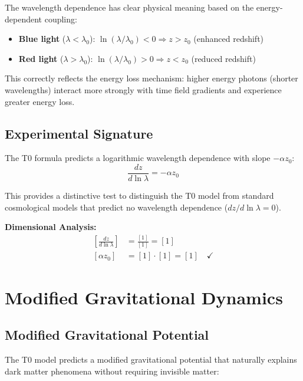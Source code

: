 \documentclass[12pt,a4paper]{report}
\begin{document}
	The wavelength dependence has clear physical meaning based on the energy-dependent coupling:
	\begin{itemize}
		\item \textbf{Blue light} ($\lambda < \lambda_0$): $\ln(\lambda/\lambda_0) < 0 \Rightarrow z > z_0$ (enhanced redshift)
		\item \textbf{Red light} ($\lambda > \lambda_0$): $\ln(\lambda/\lambda_0) > 0 \Rightarrow z < z_0$ (reduced redshift)
	\end{itemize}
	
	This correctly reflects the energy loss mechanism: higher energy photons (shorter wavelengths) interact more strongly with time field gradients and experience greater energy loss.
	
	\subsection{Experimental Signature}
	\label{subsec:experimental_signature}
	
	The T0 formula predicts a logarithmic wavelength dependence with slope $-\alpha z_0$:
	\begin{equation}
		\frac{dz}{d\ln\lambda} = -\alpha z_0
	\end{equation}
	
	This provides a distinctive test to distinguish the T0 model from standard cosmological models that predict no wavelength dependence ($dz/d\ln\lambda = 0$).
	
	\textbf{Dimensional Analysis:}
	\begin{align}
		\left[\frac{dz}{d\ln\lambda}\right] &= \frac{[1]}{[1]} = [1] \\
		[\alpha z_0] &= [1] \cdot [1] = [1] \quad \checkmark
	\end{align}
	
	\section{Modified Gravitational Dynamics}
	\label{sec:modified_gravitational_dynamics}
	
\subsection{Modified Gravitational Potential}
\label{subsec:modified_potential}

The T0 model predicts a modified gravitational potential that naturally explains dark matter phenomena without requiring invisible matter:
\end{document}
